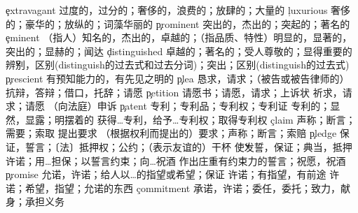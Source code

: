 \begin{multicols}{2}
\c{extravagant}  \a 过度的，过分的；奢侈的，浪费的；放肆的；大量的
\c{luxurious}  \a 奢侈的；豪华的；放纵的；词藻华丽的
\c{prominent}  \a 突出的，杰出的；突起的；著名的
\c{eminent}  \a （指人）知名的，杰出的，卓越的；（指品质、特性）明显的，显著的，突出的；显赫的；闻达
\c{distinguished}  \a 卓越的；著名的；受人尊敬的；显得重要的 \v 辨别，区别(distinguish的过去式和过去分词)；突出；区别(distinguish的过去式)
\c{prescient}  \a 有预知能力的，有先见之明的
\c{plea}  \n 恳求，请求；（被告或被告律师的）抗辩，答辩；借口，托辞；请愿
\c{petition}  \n 请愿书；请愿，请求；上诉状 \vi 祈求，请求；请愿 \vt （向法庭）申诉
\c{patent}  \n 专利；专利品；专利权；专利证 \a 专利的；显然，显露；明摆着的 \vt 获得…专利，给予…专利权；取得专利权
\c{claim}  \vt 声称；断言；需要；索取 \vi 提出要求 \n （根据权利而提出的）要求；声称；断言；索赔
\c{pledge}  \n 保证，誓言；〔法〕抵押权；公约；（表示友谊的）干杯 \v 使发誓，保证；典当，抵押 \vt 许诺；用…担保；以誓言约束；向…祝酒 \vi 作出庄重有约束力的誓言；祝愿，祝酒
\c{promise}  \vt 允诺，许诺；给人以…的指望或希望；保证 \vi 许诺；有指望，有前途 \n 许诺；希望，指望；允诺的东西
\c{commitment}  \n 承诺，许诺；委任，委托；致力，献身；承担义务









\end{multicols}
